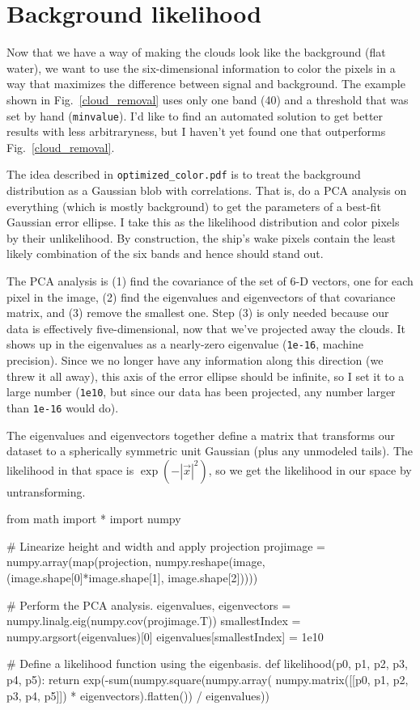 \documentclass[12pt]{article}
\begin{document}
\section{Background likelihood}

Now that we have a way of making the clouds look like the background
(flat water), we want to use the six-dimensional information to color
the pixels in a way that maximizes the difference between signal and
background.  The example shown in Fig.~\ref{cloud_removal} uses only
one band (40) and a threshold that was set by hand ({\tt minvalue}).
I'd like to find an automated solution to get better results with less
arbitraryness, but I haven't yet found one that outperforms
Fig.~\ref{cloud_removal}.

The idea described in {\tt optimized\_color.pdf} is to
treat the background distribution as a Gaussian blob with
correlations.  That is, do a PCA analysis on everything (which is
mostly background) to get the parameters of a best-fit Gaussian error
ellipse.  I take this as the likelihood distribution and color pixels
by their unlikelihood.  By construction, the ship's wake pixels
contain the least likely combination of the six bands and hence should
stand out.

The PCA analysis is (1) find the covariance of the set of 6-D vectors,
one for each pixel in the image, (2) find the eigenvalues and
eigenvectors of that covariance matrix, and (3) remove the smallest
one.  Step (3) is only needed because our data is effectively
five-dimensional, now that we've projected away the clouds.  It shows
up in the eigenvalues as a nearly-zero eigenvalue ({\tt 1e-16},
machine precision).  Since we no longer have any information along
this direction (we threw it all away), this axis of the error ellipse
should be infinite, so I set it to a large number ({\tt 1e10}, but
since our data has been projected, any number larger than {\tt 1e-16}
would do).

The eigenvalues and eigenvectors together define a matrix that
transforms our dataset to a spherically symmetric unit Gaussian (plus
any unmodeled tails).  The likelihood in that space is
$\exp(-|\vec{x}|^2)$, so we get the likelihood in our space by untransforming.

\begin{python}
from math import *
import numpy

# Linearize height and width and apply projection
projimage = numpy.array(map(projection,
    numpy.reshape(image, (image.shape[0]*image.shape[1], image.shape[2]))))

# Perform the PCA analysis.
eigenvalues, eigenvectors = numpy.linalg.eig(numpy.cov(projimage.T))
smallestIndex = numpy.argsort(eigenvalues)[0]
eigenvalues[smallestIndex] = 1e10

# Define a likelihood function using the eigenbasis.
def likelihood(p0, p1, p2, p3, p4, p5):
    return exp(-sum(numpy.square(numpy.array(
        numpy.matrix([[p0, p1, p2, p3, p4, p5]]) * eigenvectors).flatten())
        / eigenvalues))
\end{python}
\end{document}
